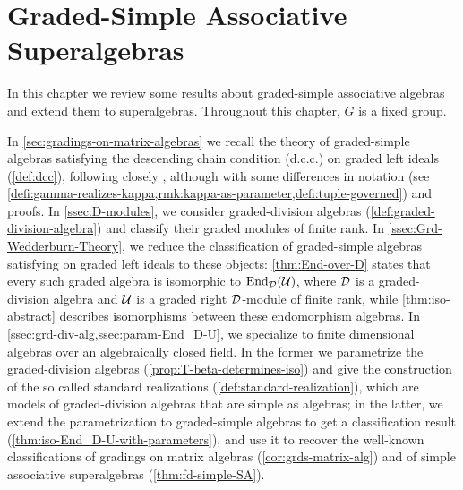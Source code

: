 \chapter{Graded-Simple Associative Superalgebras}\label{chap:grd-simple-assc}

In this chapter we review some results about graded-simple associative algebras and extend them to superalgebras. 
Throughout this chapter, $G$ is a fixed group. 

In \cref{sec:gradings-on-matrix-algebras} we recall the theory of graded-simple algebras satisfying the descending chain condition (d.c.c.) on graded left ideals (\cref{def:dcc}), following closely \cite[Chapter 2]{livromicha}, although with some differences in notation (see \cref{defi:gamma-realizes-kappa,rmk:kappa-as-parameter,defi:tuple-governed}) and proofs. 
In \cref{ssec:D-modules}, we consider graded-division algebras (\cref{def:graded-division-algebra}) and classify their graded modules of finite rank. 
In \cref{ssec:Grd-Wedderburn-Theory}, we reduce the classification of graded-simple algebras satisfying \dcc on graded left ideals to these objects:  \cref{thm:End-over-D} states that every such graded algebra is isomorphic to $\operatorname{End}_{\mathcal{D}} (\mathcal U)$, where $\mathcal{D}$ is a graded-division algebra and $\mathcal U$ is a graded right $\mathcal{D}$-module of finite rank, while \cref{thm:iso-abstract} describes isomorphisms between these endomorphism algebras. 
In \cref{ssec:grd-div-alg,ssec:param-End_D-U}, we specialize to finite dimensional algebras over an algebraically closed field. 
In the former we parametrize the graded-division algebras (\cref{prop:T-beta-determines-iso})
and give the construction of the so called standard realizations (\cref{def:standard-realization}), which are models of graded-division algebras that are simple as algebras; in the latter, we extend the parametrization to graded-simple algebras to get a classification result (\cref{thm:iso-End_D-U-with-parameters}), and use it to recover the well-known classifications of gradings on matrix algebras (\cref{cor:grds-matrix-alg}) and of simple associative superalgebras (\cref{thm:fd-simple-SA}). 

